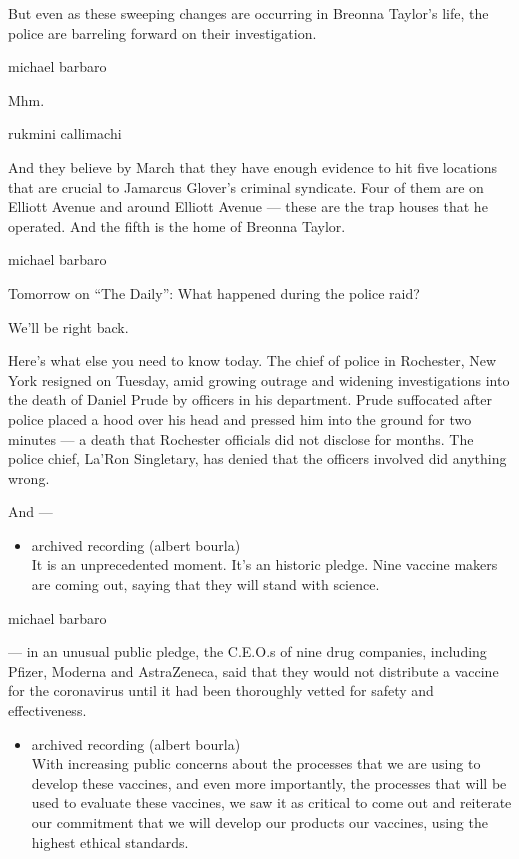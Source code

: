 But even as these sweeping changes are occurring in Breonna Taylor's
life, the police are barreling forward on their investigation.

michael barbaro

Mhm.

rukmini callimachi

And they believe by March that they have enough evidence to hit five
locations that are crucial to Jamarcus Glover's criminal syndicate. Four
of them are on Elliott Avenue and around Elliott Avenue --- these are
the trap houses that he operated. And the fifth is the home of Breonna
Taylor.

michael barbaro

Tomorrow on ``The Daily'': What happened during the police raid?

We'll be right back.

Here's what else you need to know today. The chief of police in
Rochester, New York resigned on Tuesday, amid growing outrage and
widening investigations into the death of Daniel Prude by officers in
his department. Prude suffocated after police placed a hood over his
head and pressed him into the ground for two minutes --- a death that
Rochester officials did not disclose for months. The police chief,
La'Ron Singletary, has denied that the officers involved did anything
wrong.

And ---

\begin{itemize}
\tightlist
\item
  archived recording (albert bourla)\\
  It is an unprecedented moment. It's an historic pledge. Nine vaccine
  makers are coming out, saying that they will stand with science.
\end{itemize}

michael barbaro

--- in an unusual public pledge, the C.E.O.s of nine drug companies,
including Pfizer, Moderna and AstraZeneca, said that they would not
distribute a vaccine for the coronavirus until it had been thoroughly
vetted for safety and effectiveness.

\begin{itemize}
\tightlist
\item
  archived recording (albert bourla)\\
  With increasing public concerns about the processes that we are using
  to develop these vaccines, and even more importantly, the processes
  that will be used to evaluate these vaccines, we saw it as critical to
  come out and reiterate our commitment that we will develop our
  products our vaccines, using the highest ethical standards.
\end{itemize}


